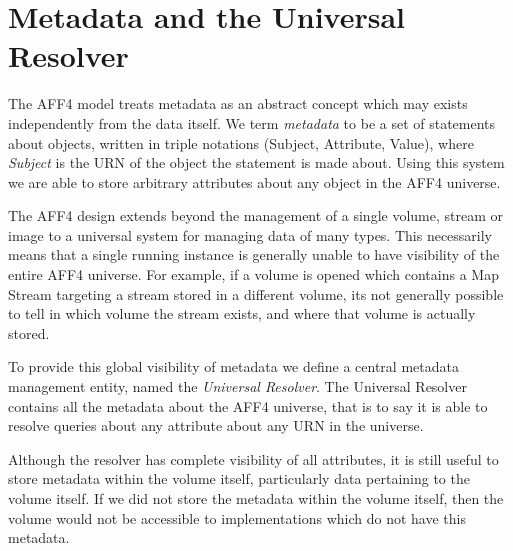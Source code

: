 \documentclass[10pt, conference]{IEEEtran}
\begin{document}




\section{Metadata and the Universal Resolver}
The AFF4 model treats metadata as an abstract concept which may exists
independently from the data itself. We term {\em metadata} to be a set
of statements about objects, written in triple notations (Subject,
Attribute, Value), where {\em Subject} is the URN of the object the
statement is made about. Using this system we are able to store
arbitrary attributes about any object in the AFF4 universe.

The AFF4 design extends beyond the management of a single volume,
stream or image to a universal system for managing data of many
types. This necessarily means that a single running instance is
generally unable to have visibility of the entire AFF4 universe. For
example, if a volume is opened which contains a Map Stream targeting a
stream stored in a different volume, its not generally possible to
tell in which volume the stream exists, and where that volume is
actually stored.

To provide this global visibility of metadata we define a central
metadata management entity, named the {\em Universal Resolver}. The
Universal Resolver contains all the metadata about the AFF4 universe,
that is to say it is able to resolve queries about any attribute about
any URN in the universe.

Although the resolver has complete visibility of all attributes, it is
still useful to store metadata within the volume itself, particularly
data pertaining to the volume itself. If we did not store the metadata
within the volume itself, then the volume would not be accessible to
implementations which do not have this metadata.
\end{document}
